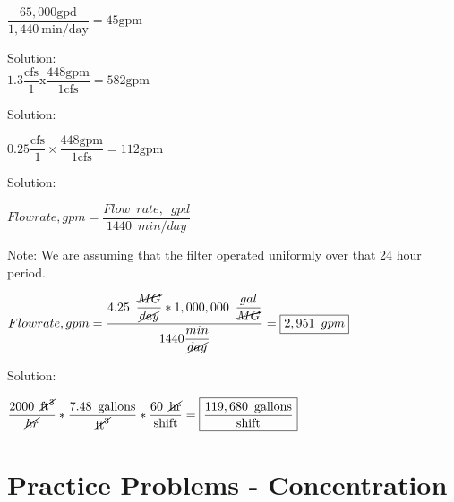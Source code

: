 $
\dfrac{65,000 \mathrm{gpd}}{1,440 \mathrm{~min} / \mathrm{day}}=45 \mathrm{gpm}
$

\vspace{0.4cm}

Solution:\\
$
1.3 \dfrac{\mathrm{cfs}}{1} \mathrm{x} \dfrac{448 \mathrm{gpm}}{1 \mathrm{cfs}}=582 \mathrm{gpm}
$

\vspace{0.4cm}

Solution:\\

\vspace{0.4cm}

$
0.25 \dfrac{\mathrm{cfs}}{1} \times \dfrac{448 \mathrm{gpm}}{1 \mathrm{cfs}}=112 \mathrm{gpm}
$

\vspace{0.4cm}

Solution:\\

\vspace{0.2cm}

$Flow rate, gpm=\dfrac{Flow \enspace rate, \enspace gpd}{1440 \enspace min/day}$\\

\vspace{0.2cm}

Note:  We are assuming that the filter operated uniformly over that 24 hour period.\\

\vspace{0.3cm}

$Flow rate, gpm=\dfrac{4.25 \enspace \dfrac{\cancel{MG}}{\cancel{day}} *1,000,000 \enspace \dfrac{gal}{\cancel{MG}}}{1440\dfrac{min}{\cancel{day}}}=\boxed{2,951 \enspace gpm}$


Solution:\\

\vspace{0.4cm}

$\dfrac{2000 \enspace \cancel{\mathrm{ft}^3}}{\cancel{hr}}*  \dfrac{7.48 \enspace{\mathrm{gallons}}}{\cancel{\mathrm{ft}^3}}  * \dfrac{60 \enspace \cancel{\mathrm{hr}}}{\mathrm{shift}}   = \boxed{\dfrac{119,680 \enspace \mathrm{gallons}}{\mathrm{shift}}}$

\vspace{0.4cm}



\vspace{1cm}

\section*{Practice Problems - Concentration}

